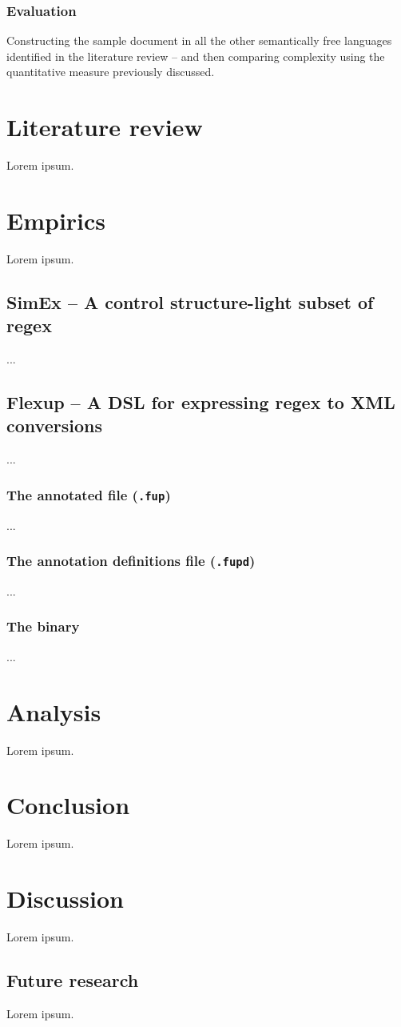 \documentclass{scrreprt}
\begin{document}
\subsection{Evaluation}
Constructing the sample document in all the other semantically free languages identified in the literature review -- and then comparing complexity using the quantitative measure previously discussed.






\chapter{Literature review}
Lorem ipsum.






\chapter{Empirics}
Lorem ipsum.


\section{SimEx -- A control structure-light subset of regex}
...


\section{Flexup -- A DSL for expressing regex to XML conversions}
...

\subsection{The annotated file (\texttt{.fup})}
...

\subsection{The annotation definitions file (\texttt{.fupd})}
...

\subsection{The binary}
...





\chapter{Analysis}
Lorem ipsum.





\chapter{Conclusion}
Lorem ipsum.





\chapter{Discussion}
Lorem ipsum.

\section{Future research}
Lorem ipsum.
\end{document}
